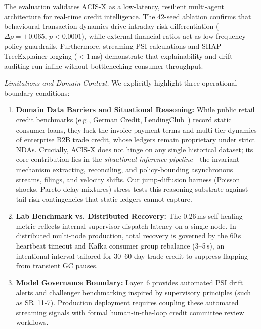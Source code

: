 \documentclass[runningheads]{llncs}
\begin{document}
The evaluation validates ACIS-X as a low-latency, resilient multi-agent architecture for real-time credit intelligence. The 42-seed ablation confirms that behavioural transaction dynamics drive intraday risk differentiation ($\Delta\rho=+0.065$, $p<0.0001$), while external financial ratios act as low-frequency policy guardrails. Furthermore, streaming PSI calculations and SHAP TreeExplainer logging ($<1$\,ms) demonstrate that explainability and drift auditing run inline without bottlenecking consumer throughput.

\noindent\textit{Limitations and Domain Context.} We explicitly highlight three operational boundary conditions:
\begin{enumerate}
  \setlength{\itemsep}{1pt}
  \setlength{\parskip}{0pt}
  \setlength{\parsep}{0pt}
  \item \textbf{Domain Data Barriers and Situational Reasoning:} While public retail credit benchmarks (e.g., German Credit, LendingClub~\cite{jajoo2025masca,kubam2026agentic}) record static consumer loans, they lack the invoice payment terms and multi-tier dynamics of enterprise B2B trade credit, whose ledgers remain proprietary under strict NDAs. Crucially, ACIS-X does not hinge on any single historical dataset; its core contribution lies in the \textit{situational inference pipeline}---the invariant mechanism extracting, reconciling, and policy-bounding asynchronous streams, filings, and velocity shifts. Our jump-diffusion harness (Poisson shocks, Pareto delay mixtures) stress-tests this reasoning substrate against tail-risk contingencies that static ledgers cannot capture.
  \item \textbf{Lab Benchmark vs. Distributed Recovery:} The 0.26\,ms self-healing metric reflects internal supervisor dispatch latency on a single node. In distributed multi-node production, total recovery is governed by the 60\,s heartbeat timeout and Kafka consumer group rebalance (3--5\,s), an intentional interval tailored for 30--60 day trade credit to suppress flapping from transient GC pauses.
  \item \textbf{Model Governance Boundary:} Layer~6 provides automated PSI drift alerts and challenger benchmarking inspired by supervisory principles (such as SR~11-7). Production deployment requires coupling these automated streaming signals with formal human-in-the-loop credit committee review workflows.
\end{enumerate}
\end{document}
